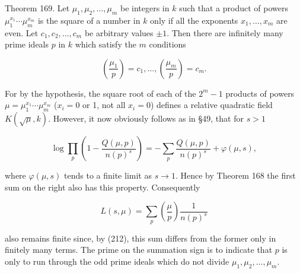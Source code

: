 Theorem 169. Let $\mu_1, \mu_2, \ldots, \mu_m$ be integers in $k$ such that a product of powers $\mu_1^{x_1} \cdots \mu_m^{x_m}$ is the square of a number in $k$ only if all the exponents $x_1, \ldots, x_m$ are even. Let $c_1, c_2, \ldots, c_m$ be arbitrary values $\pm 1$. Then there are infinitely many prime ideals $p$ in $k$ which satisfy the $m$ conditions

$$\left( \frac{\mu_1}{p} \right) = c_1, \ldots, \left( \frac{\mu_m}{p} \right) = c_m.$$

For by the hypothesis, the square root of each of the $2^m - 1$ products of powers $\mu = \mu_1^{x_1} \cdots \mu_m^{x_m}$ ($x_i = 0$ or 1, not all $x_i = 0$) defines a relative quadratic field $K(\sqrt{\mu}, k)$. However, it now obviously follows as in §49, that for $s > 1$

$$\log \prod_p \left( 1 - \frac{Q(\mu, p)}{n(p)^s} \right) = -\sum_p \frac{Q(\mu, p)}{n(p)^s} + \varphi(\mu, s),$$

where $\varphi(\mu, s)$ tends to a finite limit as $s \to 1$. Hence by Theorem 168 the first sum on the right also has this property. Consequently

$$L(s, \mu) = \sum_p \left( \frac{\mu}{p} \right) \frac{1}{n(p)^s}$$

also remains finite since, by (212), this sum differs from the former only in finitely many terms. The prime on the summation sign is to indicate that $p$ is only to run through the odd prime ideals which do not divide $\mu_1, \mu_2, \ldots, \mu_m$.
